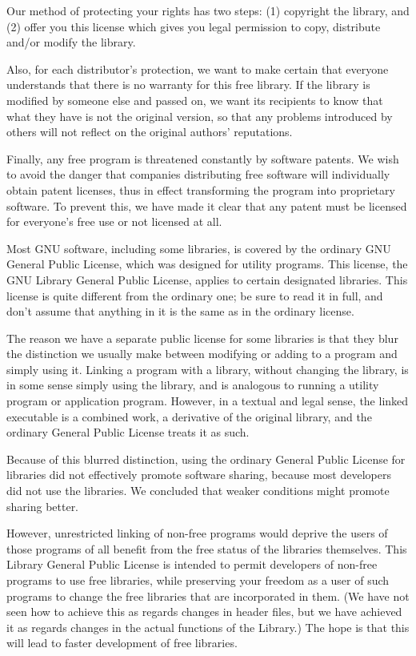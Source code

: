 \begin{multicols}{3}
Our method of protecting your rights has two steps: (1) copyright the
library, and (2) offer you this license which gives you legal permission to
copy, distribute and/or modify the library.

Also, for each distributor's protection, we want to make certain that
everyone understands that there is no warranty for this free library. If
the library is modified by someone else and passed on, we want its
recipients to know that what they have is not the original version, so that
any problems introduced by others will not reflect on the original authors'
reputations.

Finally, any free program is threatened constantly by software patents. We
wish to avoid the danger that companies distributing free software will
individually obtain patent licenses, thus in effect transforming the
program into proprietary software. To prevent this, we have made it clear
that any patent must be licensed for everyone's free use or not licensed at
all.

Most GNU software, including some libraries, is covered by the ordinary GNU
General Public License, which was designed for utility programs. This
license, the GNU Library General Public License, applies to certain
designated libraries. This license is quite different from the ordinary
one; be sure to read it in full, and don't assume that anything in it is
the same as in the ordinary license.

The reason we have a separate public license for some libraries is that
they blur the distinction we usually make between modifying or adding to a
program and simply using it. Linking a program with a library, without
changing the library, is in some sense simply using the library, and is
analogous to running a utility program or application program. However, in
a textual and legal sense, the linked executable is a combined work, a
derivative of the original library, and the ordinary General Public License
treats it as such.

Because of this blurred distinction, using the ordinary General Public
License for libraries did not effectively promote software sharing, because
most developers did not use the libraries. We concluded that weaker
conditions might promote sharing better.

However, unrestricted linking of non-free programs would deprive the users
of those programs of all benefit from the free status of the libraries
themselves. This Library General Public License is intended to permit
developers of non-free programs to use free libraries, while preserving
your freedom as a user of such programs to change the free libraries that
are incorporated in them. (We have not seen how to achieve this as regards
changes in header files, but we have achieved it as regards changes in the
actual functions of the Library.) The hope is that this will lead to faster
development of free libraries.


\end{multicols}
